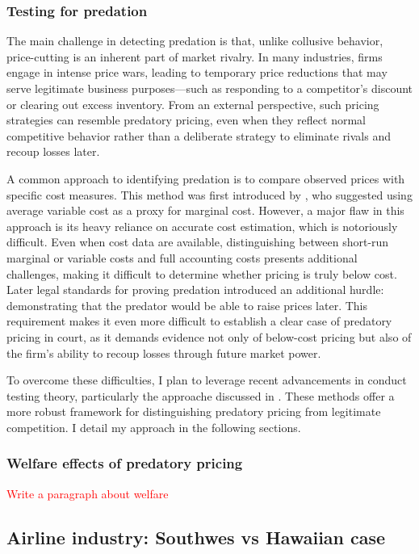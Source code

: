 \documentclass[12pt,oneside]{article}
\theoremstyle{definition}
\theoremstyle{remark}
\begin{document}
\subsubsection{Testing for predation}



The main challenge in detecting predation is that, unlike collusive behavior, price-cutting is an inherent part of market rivalry. In many industries, firms engage in intense price wars, leading to temporary price reductions that may serve legitimate business purposes—such as responding to a competitor’s discount or clearing out excess inventory. From an external perspective, such pricing strategies can resemble predatory pricing, even when they reflect normal competitive behavior rather than a deliberate strategy to eliminate rivals and recoup losses later.

A common approach to identifying predation is to compare observed prices with specific cost measures. This method was first introduced by \cite{Areeda1975}, who suggested using average variable cost as a proxy for marginal cost. However, a major flaw in this approach is its heavy reliance on accurate cost estimation, which is notoriously difficult. Even when cost data are available, distinguishing between short-run marginal or variable costs and full accounting costs presents additional challenges, making it difficult to determine whether pricing is truly below cost. Later legal standards for proving predation introduced an additional hurdle: demonstrating that the predator would be able to raise prices later. This requirement makes it even more difficult to establish a clear case of predatory pricing in court, as it demands evidence not only of below-cost pricing but also of the firm’s ability to recoup losses through future market power.

To overcome these difficulties, I plan to leverage recent advancements in conduct testing theory, particularly the approache discussed in \cite{Backus2021}. These methods offer a more robust framework for distinguishing predatory pricing from legitimate competition. I detail my approach in the following sections. 

\subsubsection{Welfare effects of predatory pricing}
\textcolor{red}{Write a paragraph about welfare}
\subsection{Airline industry: Southwes vs Hawaiian case}
\end{document}
